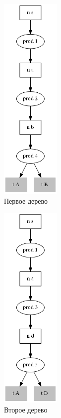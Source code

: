 \begin{figure}[h]
    \centering
    \begin{subfigure}{0.25\textwidth}
        \includegraphics[height=100mm]{Pictures/SPPF_YC_ex1.png}
        \caption*{Первое дерево}
    \end{subfigure}
    \qquad
    \begin{subfigure}{0.25\textwidth}
        \includegraphics[height=100mm]{Pictures/SPPF_YC_ex2.png}
        \caption*{Второе дерево}
    \end{subfigure}
    \qquad
    \begin{subfigure}{0.25\textwidth}

\end{subfigure}
\end{figure}
